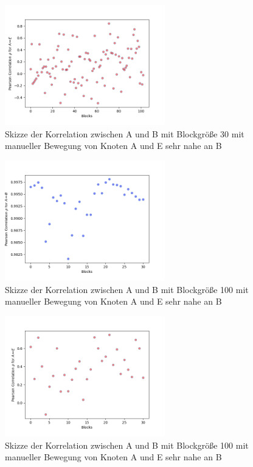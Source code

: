 \documentclass[12pt,a4paper]{article}
\begin{document}
\begin{figure}[hbt!]
	\centering
		\includegraphics[width=0.62\textwidth ]
		{Bilder/a3-t5-block30-correlation-AE.png}
		\caption{Skizze der Korrelation zwischen A und B mit Blockgröße 30 mit manueller Bewegung von Knoten A und E sehr nahe an B}
		\label{fig:Label19}
\end{figure}
\clearpage


\begin{figure}[hbt!]
	\centering
		\includegraphics[width=0.62\textwidth ]
		{Bilder/a3-t5-block100-correlation-AB.png}
		\caption{Skizze der Korrelation zwischen A und B mit Blockgröße 100 mit manueller Bewegung von Knoten A und E sehr nahe an B}
		\label{fig:Label20}
\end{figure}

\begin{figure}[hbt!]
	\centering
		\includegraphics[width=0.62\textwidth ]
		{Bilder/a3-t5-block100-correlation-AE.png}
		\caption{Skizze der Korrelation zwischen A und B mit Blockgröße 100 mit manueller Bewegung von Knoten A und E sehr nahe an B}
		\label{fig:Label21}
\end{figure}
\clearpage
\end{document}
